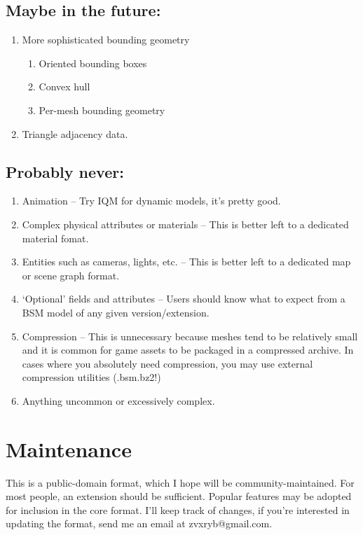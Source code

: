 \documentclass{article}
\begin{document}
\subsection{Maybe in the future:}
\begin{enumerate}
	\item More sophisticated bounding geometry
	\begin{enumerate}
		\item Oriented bounding boxes
		\item Convex hull
		\item Per-mesh bounding geometry
	\end{enumerate}
	\item Triangle adjacency data.
\end{enumerate}

\subsection{Probably never:}
\begin{enumerate}
	\item Animation -- Try IQM for dynamic models, it's pretty good.
	\item Complex physical attributes or materials -- This is better left to a dedicated material fomat.
	\item Entities such as cameras, lights, etc. -- This is better left to a dedicated map or scene graph format.
	\item `Optional' fields and attributes -- Users should know what to expect from a BSM model of any given version/extension.
	\item Compression -- This is unnecessary because meshes tend to be relatively small and it is common for game assets to be packaged in a compressed archive.  In cases where you absolutely need compression, you may use external compression utilities (.bsm.bz2!)
	\item Anything uncommon or excessively complex.
\end{enumerate}

\section{Maintenance}
This is a public-domain format, which I hope will be community-maintained.  For most people, an extension should be sufficient.  Popular features may be adopted for inclusion in the core format.  I'll keep track of changes, if you're interested in updating the format, send me an email at zvxryb@gmail.com.\\
\end{document}
